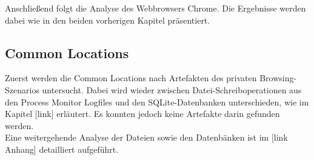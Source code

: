 Anschließend folgt die Analyse des Webbrowsers Chrome. Die Ergebnisse werden dabei wie in den beiden vorherigen Kapitel präsentiert.

\subsection*{Common Locations}

Zuerst werden die Common Locations nach Artefakten des privaten Browsing-Szenarios untersucht. Dabei wird wieder zwischen Datei-Schreiboperationen aus den Process Monitor Logfiles und den SQLite-Datenbanken unterschieden, wie im Kapitel [link] erläutert. Es konnten jedoch keine Artefakte darin gefunden werden.\\
Eine weitergehende Analyse der Dateien sowie den Datenbänken ist im [link Anhang] detailliert aufgeführt.

